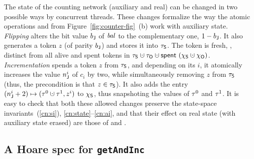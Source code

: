 The state of the counting network (auxiliary and real) can be changed
in two possible ways by concurrent threads. These changes formalize
the way the atomic operations  and  from
Figure~\ref{fig:counter-fig}~(b) work with auxiliary state.
%
\emph{Flipping} alters the bit value $b_{\mathsf{J}}$ of $\mathit{bal}$ to the
complementary one, $1 - b_{\mathsf{J}}$.
%
It also generates a token $z$ (of parity $b_{\mathsf{J}}$) and stores it
into $\tau_{\mathsf{S}}$. The token is fresh, \ie, distinct from all alive and
spent tokens in $\tkns \hunion \tkno \hunion{\Tomb~(\hists
  \hunion \histo)}$.
%
\emph{Incrementation} spends a token $z$ from $\tau_{\mathsf{S}}$, and depending
on its $i$, it atomically increases the value $n^i_{\mathsf{J}}$ of $c_i$ by
two, while simultaneously removing $z$ from $\tau_{\mathsf{S}}$ (thus, the
precondition is that $z \in \tau_{\mathsf{S}}$). It also adds the entry
$(n^i_\joint + 2) \hpts (\tkn^0 \hunion \tkn^1, z^i)$ to $\chi_{\mathsf{S}}$,
thus snapshoting the values of $\tau^0$ and $\tau^1$.
%
It is easy to check that both these allowed changes preserve the
state-space invariants~(\ref{cn:si}), \ref{cn:state}--\ref{cn:ai}, and
that their effect on real state (with auxiliary state erased) are
those of  and .

\subsection{A Hoare spec for \texttt{getAndInc}}
\label{sec:spec-gaa}

